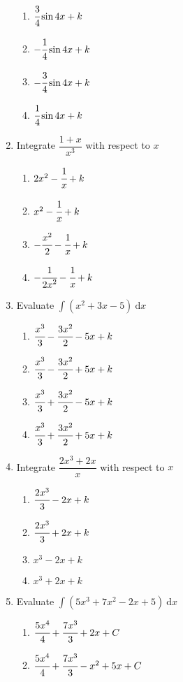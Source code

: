 \begin{multicols}{2}
\begin{enumerate}[label={\arabic*.}]
	\begin{enumerate}[label={\Alph*.}]
	\item \(\cfrac{3}{4}\sin{4x} + k\)
	\item \(-{\cfrac{1}{4}\sin{4x}} + k\)
	\item \(-{\cfrac{3}{4}\sin{4x}} + k\)
	\item \({\cfrac{1}{4}\sin{4x}} + k\)
	\end{enumerate}
\item Integrate \(\dfrac{1+x}{{x}^{3}}\) with respect to \(x\)
	\begin{enumerate}[label={\Alph*.}]
	\item \(2{x}^{2} -\cfrac{1}{x} + k \)
	\item \({x}^{2} -\cfrac{1}{x} + k \)
	\item \(-{\cfrac{{x}^{2}}{2}} -\cfrac{1}{x} + k \)
	\item \(-{\cfrac{1}{{2x}^{2}}} -\cfrac{1}{x} + k \)
	\end{enumerate}
\item Evaluate \(\displaystyle \int \left({x}^{2}+3x-5\right)\ \mathrm{d}x\)
	\begin{enumerate}[label={\Alph*.}]
	\item \({\cfrac{{x}^{3}}{3}} - {\cfrac{3{x}^{2}}{2}} - 5x + k \)
	\item \({\cfrac{{x}^{3}}{3}} - {\cfrac{3{x}^{2}}{2}} + 5x + k \)
	\item \({\cfrac{{x}^{3}}{3}} + {\cfrac{3{x}^{2}}{2}} - 5x + k \)
	\item \({\cfrac{{x}^{3}}{3}} + {\cfrac{3{x}^{2}}{2}} + 5x + k \)
	\end{enumerate}
\item Integrate \(\dfrac{2x^3+2x}{x}\) with respect to \(x\)
	\begin{enumerate}[label={\Alph*.}]
	\item \({\cfrac{2{x}^{3}}{3}} - 2x + k \)
	\item \({\cfrac{2{x}^{3}}{3}} + 2x + k \)
	\item \({x}^{3} - 2x + k \)
	\item \({x}^{3} + 2x + k \)
	\end{enumerate}
\item Evaluate \(\displaystyle \int \left(5{x}^{3} + 7{x}^{2} -2x + 5\right)\ \mathrm{d}x\)
	\begin{enumerate}[label={\Alph*.}]
	\item \({\cfrac{5{x}^{4}}{4}} + {\cfrac{7{x}^{3}}{3}} + 2x + C \)
	\item \({\cfrac{5{x}^{4}}{4}} + {\cfrac{7{x}^{3}}{3}} - {x}^{2} + 5x + C \)

\end{enumerate}
\end{enumerate}
\end{multicols}
